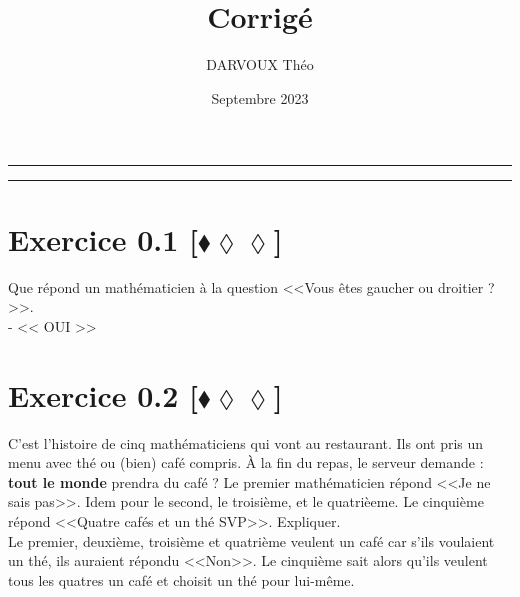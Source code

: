 \documentclass[10pt]{article}
\title{\bf{\pagetitle}\\\large{Corrigé}}
\date{Septembre 2023}
\author{DARVOUX Théo}
\def\pagetitle{Logique}
\begin{document}
\renewcommand*\contentsname{Exercices.}
\renewcommand*{\cftsecleader}{\cftdotfill{\cftdotsep}}
\maketitle
\hrule
\tableofcontents
\vspace{0.5cm}
\hrule

\thispagestyle{fancy}
\fancyhead[C]{\pagetitle}


\section*{Exercice 0.1 [$\blacklozenge\lozenge\lozenge$]}
\begin{tcolorbox}[enhanced, width=6in, center, size=fbox, fontupper=\large, drop shadow southwest]
    Que répond un mathématicien à la question <<Vous êtes gaucher ou droitier ?>>.\\
    - << OUI >>
\end{tcolorbox}

\section*{Exercice 0.2 [$\blacklozenge\lozenge\lozenge$]}
\begin{tcolorbox}[enhanced, width=6in, center, size=fbox, fontupper=\large, drop shadow southwest]
    C'est l'histoire de cinq mathématiciens qui vont au restaurant. Ils ont pris un menu avec thé ou (bien) café compris. À la fin du repas, le serveur demande : \textbf{tout le monde} prendra du café ? Le premier mathématicien répond <<Je ne sais pas>>. Idem pour le second, le troisième, et le quatrièeme. Le cinquième répond <<Quatre cafés et un thé SVP>>. Expliquer.\\[0.5cm]
    Le premier, deuxième, troisième et quatrième veulent un café car s'ils voulaient un thé, ils auraient répondu <<Non>>. Le cinquième sait alors qu'ils veulent tous les quatres un café et choisit un thé pour lui-même. 
\end{tcolorbox}
\end{document}
